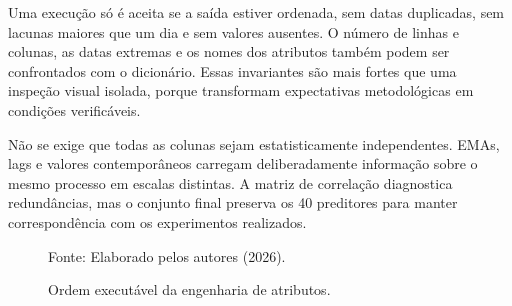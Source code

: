 Uma execução só é aceita se a saída estiver ordenada, sem datas duplicadas, sem lacunas maiores que um dia e sem valores ausentes. O número de linhas e colunas, as datas extremas e os nomes dos atributos também podem ser confrontados com o dicionário. Essas invariantes são mais fortes que uma inspeção visual isolada, porque transformam expectativas metodológicas em condições verificáveis.

Não se exige que todas as colunas sejam estatisticamente independentes. EMAs, lags e valores contemporâneos carregam deliberadamente informação sobre o mesmo processo em escalas distintas. A matriz de correlação diagnostica redundâncias, mas o conjunto final preserva os 40 preditores para manter correspondência com os experimentos realizados.

\begin{figure}[H]
\centering
{}
\caption{Ordem executável da engenharia de atributos.}
\small{Fonte: Elaborado pelos autores (2026).}
\label{fig:ordem_engenharia}
\end{figure}
